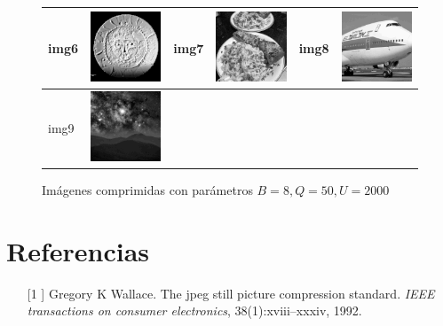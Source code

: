 \documentclass{article}
\begin{document}
\begin{figure}[!htp]
\begin{center}
\begin{tabular}[t]{|ll|ll|ll|}
\hline
img6 & \includegraphics[width=3cm]{../imgs/output/gray_8_50_2000/img06.png} &
img7 & \includegraphics[width=3cm]{../imgs/output/gray_8_50_2000/img07.png} &
img8 & \includegraphics[width=3cm]{../imgs/output/gray_8_50_2000/img08.png} \\
\hline
img9 & \includegraphics[width=3cm]{../imgs/output/gray_8_50_2000/img09.png} &&&& \\
\hline
\end{tabular}
\end{center}
\caption{Imágenes comprimidas con parámetros $B=8, Q=50, U=2000$}
\label{fig:imagenes_de_prueba_comprimidas_8_50_2000}
\end{figure}

\section*{Referencias}

\begin{itemize}
\item[[1]]
Gregory K Wallace.
The jpeg still picture compression standard.
{\em IEEE transactions on consumer electronics}, 38(1):xviii--xxxiv, 1992.
\end{itemize}
\end{document}

